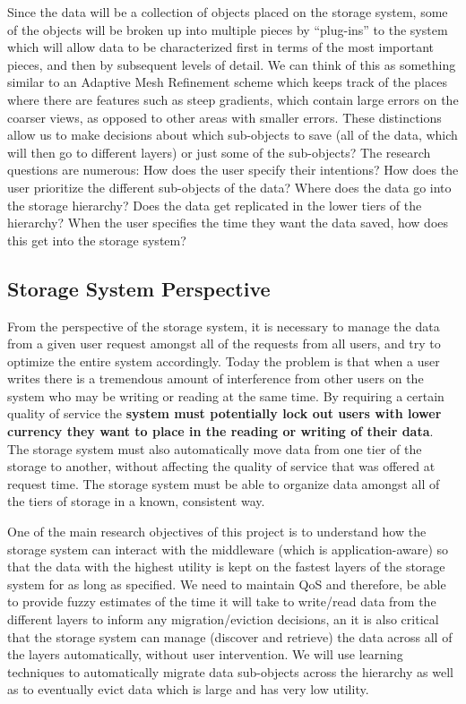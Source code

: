 Since the data will be a collection of objects placed on the storage system,
some of the objects will be broken up into multiple pieces by ``plug-ins''
to the system which will allow data to be characterized first in terms of the most
important pieces, and then by subsequent levels of detail. We can think of this as
something similar to an Adaptive Mesh Refinement scheme which keeps track of
the places where there are features such as steep gradients, which contain large errors on the
coarser views, as opposed to other areas with smaller errors. These distinctions allow us to make decisions
about which sub-objects to save (all of the data, which will then go to
different layers) or just some of the sub-objects? The research questions
are numerous: How does the user specify their intentions? How does the user
prioritize the different sub-objects of the data? Where does the data go
into the storage hierarchy? Does the data get replicated in the lower tiers
of the hierarchy? When the user specifies the time they want the data saved,
how does this get into the storage system?

\subsection{Storage System Perspective}
\label{subsec:storage-perspective}
From the perspective of the storage system, it is necessary to manage the data from
a given user request amongst all of the requests from all users, and try to optimize the
entire system accordingly. Today the problem is that when a user writes there is a
tremendous amount of interference from other users on the system who may be
writing or reading at the same time. By requiring a certain quality
of service the {\bf {\color {red} system must potentially lock out users with lower currency
they want to place in the reading or writing of their data}}. The storage
system must also automatically move data from one tier of the storage to
another, without affecting the quality of service that was offered at request
time. The storage system must be able to organize
data amongst all of the tiers of storage in a known, consistent way.

One of the main research objectives of this project is to understand how the
storage system can interact with the middleware (which is application-aware)  so
that the data with the highest utility is kept on the fastest layers of the
storage system for as long as specified. We need to maintain 
QoS and therefore, be able to provide fuzzy estimates of the time it will take to write/read data from
the different layers to inform any migration/eviction decisions, an it
is also critical that the storage system can manage (discover and retrieve) the data across all of the
layers automatically, without user intervention. We will use learning techniques to automatically migrate data
sub-objects across the hierarchy as well as to eventually evict data which is
large and has very low utility.


